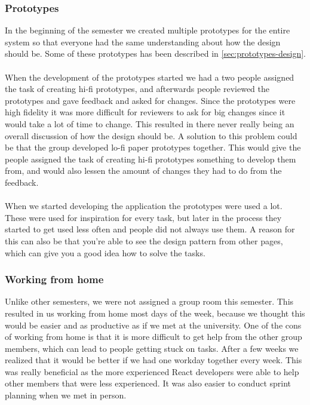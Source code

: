 \subsubsection{Prototypes}
In the beginning of the semester we created multiple prototypes for the entire system so that everyone had the same understanding about how the design should be.
Some of these prototypes has been described in \autoref{sec:prototypes-design}.
\\\\
When the development of the prototypes started we had a two people assigned the task of creating hi-fi prototypes, and afterwards people reviewed the prototypes and gave feedback and asked for changes.
Since the prototypes were high fidelity it was more difficult for reviewers to ask for big changes since it would take a lot of time to change.
This resulted in there never really being an overall discussion of how the design should be.
A solution to this problem could be that the group developed lo-fi paper prototypes together. 
This would give the people assigned the task of creating hi-fi prototypes something to develop them from, and would also lessen the amount of changes they had to do from the feedback.
\\\\
When we started developing the application the prototypes were used a lot.
These were used for inspiration for every task, but later in the process they started to get used less often and people did not always use them.
A reason for this can also be that you're able to see the design pattern from other pages, which can give you a good idea how to solve the tasks.

\subsubsection{Working from home}
Unlike other semesters, we were not assigned a group room this semester.
This resulted in us working from home most days of the week, because we thought this would be easier and as productive as if we met at the university.
One of the cons of working from home is that it is more difficult to get help from the other group members, which can lead to people getting stuck on tasks.
After a few weeks we realized that it would be better if we had one workday together every week.
This was really beneficial as the more experienced React developers were able to help other members that were less experienced.
It was also easier to conduct sprint planning when we met in person.

